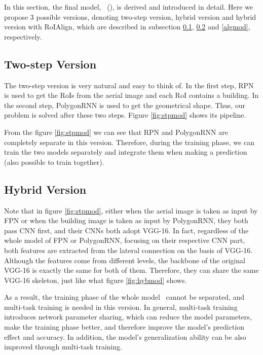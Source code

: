 In this section, the final model, \modelnameshort\ (\modelnamelong), is derived and introduced in detail. Here we propose 3 possible versions, denoting two-step version, hybrid version and hybrid version with RoIAlign, which are described in subsection \ref{stpmod}, \ref{hybmod} and \ref{algmod}, respectively.

\subsection{Two-step Version}\label{stpmod}

The two-step version is very natural and easy to think of. In the first step, RPN is used to get the RoIs from the aerial image and each RoI contains a building. In the second step, PolygonRNN is used to get the geometrical shape. Thus, our problem is solved after these two steps. Figure \ref{fig:stpmod} shows its pipeline.



From the figure \ref{fig:stpmod} we can see that RPN and PolygonRNN are completely separate in this version. Therefore, during the training phase, we can train the two models separately and integrate them when making a prediction (also possible to train together).

\subsection{Hybrid Version}\label{hybmod}
Note that in figure \ref{fig:stpmod}, either when the aerial image is taken as input by FPN or when the building image is taken as input by PolygonRNN, they both pass CNN first, and their CNNs both adopt VGG-16. In fact, regardless of the whole model of FPN or PolygonRNN, focusing on their respective CNN part, both features are extracted from the lateral connection on the basis of VGG-16. Although the features come from different levels, the backbone of the original VGG-16 is exactly the same for both of them. Therefore, they can share the same VGG-16 skeleton, just like what figure \ref{fig:hybmod} shows.



As a result, the training phase of the whole model \modelnameshort\ cannot be separated, and multi-task training is needed in this version. In general, multi-task training introduces network parameter sharing, which can reduce the model parameters, make the training phase better, and therefore improve the model's prediction effect and accuracy. In addition, the model's generalization ability can be also improved through multi-task training.

